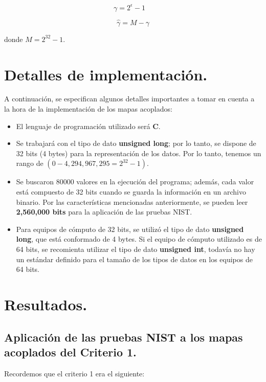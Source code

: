 \documentclass[12pt,3p]{elsarticle}
\begin{document}
\begin{equation}
\gamma = 2^{\epsilon}-1 \quad  
\end{equation}

\begin{equation}
\hat{\gamma} = M - \gamma
\end{equation}

donde $M = 2^{32}-1$.


\section{Detalles de implementación.}
A continuación, se especifican algunos detalles importantes a tomar en cuenta a la hora de la implementación de los mapas acoplados:

\begin{itemize}

\item El lenguaje de programación utilizado será \textbf{C}.
\item Se trabajará con el tipo de dato \textbf{unsigned long}; por lo tanto, se dispone de 32 bits (4 bytes) para la representación de los datos. Por lo tanto, tenemos un rango de $(0 - 4,294,967,295=2^{32} - 1) $.

\item Se buscaron 80000 valores en la ejecución del programa; además, cada valor está compuesto de 32 bits cuando se guarda la información en un archivo binario. Por las características mencionadas anteriormente, se pueden leer \textbf{2,560,000 bits} para la aplicación de las pruebas NIST.

\item Para equipos de cómputo de 32 bits, se utilizó el tipo de dato \textbf{unsigned long}, que está conformado de 4 bytes. Si el equipo de cómputo utilizado es de 64 bits, se recomienta utilizar el tipo de dato \textbf{unsigned int}, todavía no hay un estándar definido para el tamaño de los tipos de datos en los equipos de 64 bits.
\end{itemize}





\section{Resultados.}

\subsection{Aplicación de las pruebas NIST a los mapas acoplados del Criterio 1.}
Recordemos que el criterio 1 era el siguiente:
\end{document}

